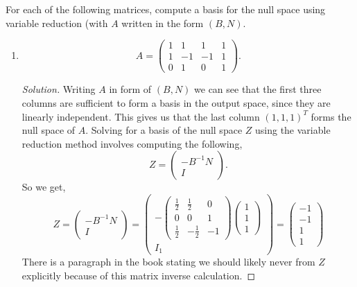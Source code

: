 \documentclass[12pt]{article}
\makeatletter
\theoremstyle{homework}
\newenvironment{exercise}[1]
{\def\@currentlabel{#1}\exercisecore}
{\endexercisecore}
\makeatother
\begin{document}
\begin{exercise}{3.1}For each of the following matrices, compute a basis for the null space using variable 
  reduction (with $A$ written in the form $(B, N)$. 
\begin{enumerate}
  \item[(i)] 
  \begin{equation*}
    A = 
  \begin{pmatrix}
    1 & 1 & 1 & 1 \\
    1 & -1 & -1 & 1 \\
    0 & 1 & 0 & 1 
  \end{pmatrix}.
\end{equation*}
  \begin{proof}[Solution] Writing $A$ in form of $(B, N)$ we can see that the first three columns are 
    sufficient to form a basis in the output space, since they are linearly independent. This gives us that the 
    last column $(1, 1, 1)^T$ forms the null space of $A$. Solving for a basis of the null space $Z$ using
    the variable reduction method involves computing the following, 
    \begin{equation*}
      Z = \begin{pmatrix}
        -B^{-1}N\\
         I
      \end{pmatrix}. 
    \end{equation*}
    So we get, 
    \begin{equation*}
      Z = \begin{pmatrix}
        -B^{-1}N\\
         I
      \end{pmatrix} = 
      \begin{pmatrix}-\begin{pmatrix}\frac{1}{2}&\frac{1}{2}&0\\ 0&0&1\\ \frac{1}{2}&-\frac{1}{2}&-1\end{pmatrix}\begin{pmatrix}1\\ 1\\ 1\end{pmatrix}\\ I_1 \end{pmatrix}   =\begin{pmatrix}-1\\ -1\\ 1\\ 1\end{pmatrix}
    \end{equation*}
    There is a paragraph in the book stating we should likely never from $Z$ explicitly because of this matrix inverse calculation. 
  \end{proof}
  \vspace{.15in}



\end{enumerate}
\end{exercise}
\end{document}
